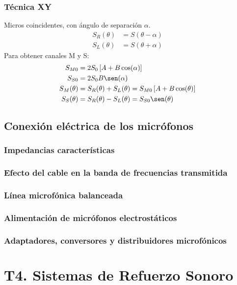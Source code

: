 \documentclass[a4paper, 8pt]{extarticle}
\renewcommand{\sin}{\sen}
\begin{document}
\begin{multicols}{3}
  \subsubsection{Técnica XY}
  Micros coincidentes, con ángulo de separación $\alpha$.
  \begin{align*}
    S_R (\theta ) & = S(\theta - \alpha ) \\
    S_L (\theta ) & = S(\theta + \alpha )
  \end{align*}
  Para obtener canales M y S:
  \begin{align*}
    S_{M0}         & = 2 S_0 \left[A + B \cos (\alpha ) \right]                                     \\
    S_{S0}         & = 2 S_0 B \sin (\alpha )                                                       \\
    S_M ( \theta ) & = S_R ( \theta ) + S_L ( \theta ) = S_{M0} \left[ A + B \cos (\theta ) \right] \\
    S_S ( \theta ) & = S_R ( \theta ) - S_L ( \theta ) = S_{S0} \sen (\theta )
  \end{align*}


  \subsection{Conexión eléctrica de los micrófonos}
  \subsubsection{Impedancias características}
  \subsubsection{Efecto del cable en la banda de frecuencias transmitida}
  \subsubsection{Línea microfónica balanceada}
  \subsubsection{Alimentación de micrófonos electrostáticos}
  \subsubsection{Adaptadores, conversores y distribuidores microfónicos}

  \newpage
  \section{T4. Sistemas de Refuerzo Sonoro}


\end{multicols}
\end{document}
